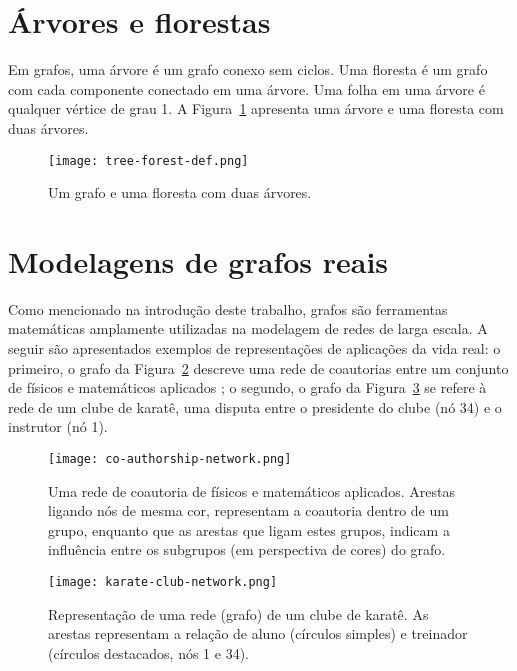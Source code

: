 \section{Árvores e florestas}
Em grafos, uma árvore é um grafo conexo sem ciclos. Uma floresta é um grafo com cada componente conectado em uma árvore. Uma folha em uma árvore é qualquer vértice de grau 1. A Figura~\ref{sec2:tree-forest-def} apresenta uma árvore e uma floresta com duas árvores.

\begin{figure}[!htb]
    \centering
    \texttt{[image: tree-forest-def.png]}
    \caption{Um grafo e uma floresta com duas árvores.}
    \label{sec2:tree-forest-def}
\end{figure}

\section{Modelagens de grafos reais}
Como mencionado na introdução deste trabalho, grafos são ferramentas matemáticas amplamente utilizadas na modelagem de
redes de larga escala. A seguir são apresentados exemplos de representações de aplicações da vida real: o primeiro, o grafo da Figura~\ref{sec2:co-authorship-network} descreve uma rede de coautorias entre um conjunto de físicos e matemáticos aplicados \cite{easley2010}; o segundo, o grafo da Figura~\ref{sec2:karate-club-network} se refere à rede de um clube de karatê, uma disputa entre o presidente do clube (nó 34) e o instrutor (nó 1).

\begin{figure}[!htb]
    \centering
    \texttt{[image: co-authorship-network.png]}
    \caption{Uma rede de coautoria de físicos e matemáticos aplicados. Arestas ligando nós de mesma cor, representam a coautoria dentro de um grupo, enquanto que as arestas que ligam estes grupos, indicam a influência entre os subgrupos (em perspectiva de cores) do grafo.}
    \label{sec2:co-authorship-network}
\end{figure}

\begin{figure}[!htb]
    \centering
    \texttt{[image: karate-club-network.png]}
    \caption{Representação de uma rede (grafo) de um clube de karatê. As arestas representam a relação de aluno (círculos simples) e treinador (círculos destacados, nós 1 e 34).}
    \label{sec2:karate-club-network}
\end{figure}